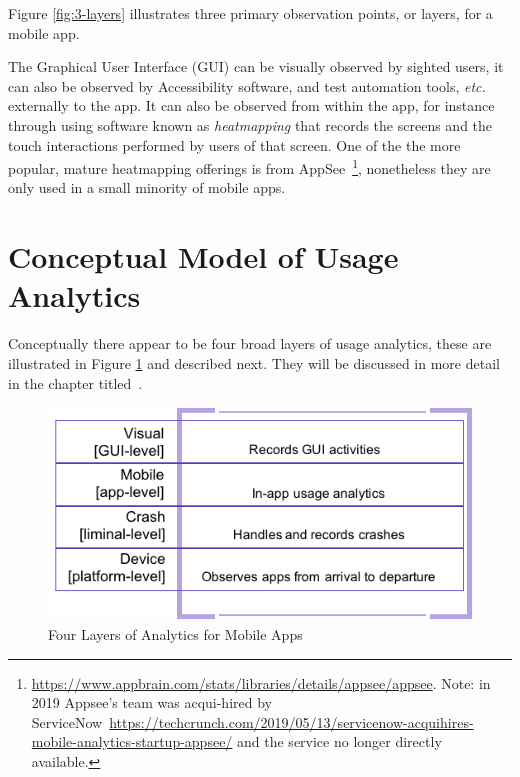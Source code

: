 Figure \ref{fig:3-layers} illustrates three primary observation points, or layers, for a mobile app. 

The Graphical User Interface (GUI) %
can be visually observed by sighted users, it can also be observed by Accessibility software, and test automation tools, \emph{etc.} externally to the app. It can also be observed from within the app, for instance through using software known as \emph{heatmapping} that records the screens and the touch interactions performed by users of that screen. One of the the more popular, mature heatmapping offerings is from AppSee~\footnote{\url{  https://www.appbrain.com/stats/libraries/details/appsee/appsee}. Note: in 2019 Appsee's team was acqui-hired by ServiceNow~\url{https://techcrunch.com/2019/05/13/servicenow-acquihires-mobile-analytics-startup-appsee/} and the service no longer directly available.}, nonetheless they are only used in a small minority of mobile apps.


\section{Conceptual Model of Usage Analytics}
Conceptually there appear to be four broad layers of usage analytics, these are illustrated in Figure \ref{fig:four-layers-of-analytics-for-mobile-apps} and described next. They will be discussed in more detail in the  chapter titled~\href{chapter-applying-analytics-to-development-practices}{\emph{}}. %

\begin{figure}[ht]
    \centering
    \includegraphics[width=12cm]{images/4-layers-of-analytics.png}
    \caption{Four Layers of Analytics for Mobile Apps}
    \label{fig:four-layers-of-analytics-for-mobile-apps}
\end{figure}


